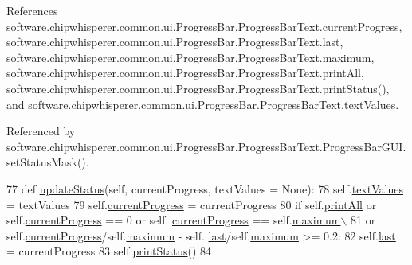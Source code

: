 References software.\+chipwhisperer.\+common.\+ui.\+Progress\+Bar.\+Progress\+Bar\+Text.\+current\+Progress, software.\+chipwhisperer.\+common.\+ui.\+Progress\+Bar.\+Progress\+Bar\+Text.\+last, software.\+chipwhisperer.\+common.\+ui.\+Progress\+Bar.\+Progress\+Bar\+Text.\+maximum, software.\+chipwhisperer.\+common.\+ui.\+Progress\+Bar.\+Progress\+Bar\+Text.\+print\+All, software.\+chipwhisperer.\+common.\+ui.\+Progress\+Bar.\+Progress\+Bar\+Text.\+print\+Status(), and software.\+chipwhisperer.\+common.\+ui.\+Progress\+Bar.\+Progress\+Bar\+Text.\+text\+Values.



Referenced by software.\+chipwhisperer.\+common.\+ui.\+Progress\+Bar.\+Progress\+Bar\+Text.\+Progress\+Bar\+G\+U\+I.\+set\+Status\+Mask().


\begin{DoxyCode}
77     \textcolor{keyword}{def }\hyperlink{classsoftware_1_1chipwhisperer_1_1common_1_1ui_1_1ProgressBar_1_1ProgressBarText_a46e30001d23b5970834a6b53bd27d80e}{updateStatus}(self, currentProgress, textValues = None):
78         self.\hyperlink{classsoftware_1_1chipwhisperer_1_1common_1_1ui_1_1ProgressBar_1_1ProgressBarText_a8cdd358344a6bb458f5c68bb41c8e99b}{textValues} = textValues
79         self.\hyperlink{classsoftware_1_1chipwhisperer_1_1common_1_1ui_1_1ProgressBar_1_1ProgressBarText_a090a37de67926fae5d5042142a064df7}{currentProgress} = currentProgress
80         \textcolor{keywordflow}{if} self.\hyperlink{classsoftware_1_1chipwhisperer_1_1common_1_1ui_1_1ProgressBar_1_1ProgressBarText_a61554f0e647192d2b7986d3f75ce401c}{printAll} \textcolor{keywordflow}{or} self.\hyperlink{classsoftware_1_1chipwhisperer_1_1common_1_1ui_1_1ProgressBar_1_1ProgressBarText_a090a37de67926fae5d5042142a064df7}{currentProgress} == 0 \textcolor{keywordflow}{or} self.
      \hyperlink{classsoftware_1_1chipwhisperer_1_1common_1_1ui_1_1ProgressBar_1_1ProgressBarText_a090a37de67926fae5d5042142a064df7}{currentProgress} == self.\hyperlink{classsoftware_1_1chipwhisperer_1_1common_1_1ui_1_1ProgressBar_1_1ProgressBarText_af23b7a0eff3cadc131c1aa94eda45860}{maximum}\(\backslash\)
81                 \textcolor{keywordflow}{or} self.\hyperlink{classsoftware_1_1chipwhisperer_1_1common_1_1ui_1_1ProgressBar_1_1ProgressBarText_a090a37de67926fae5d5042142a064df7}{currentProgress}/self.\hyperlink{classsoftware_1_1chipwhisperer_1_1common_1_1ui_1_1ProgressBar_1_1ProgressBarText_af23b7a0eff3cadc131c1aa94eda45860}{maximum} - self.
      \hyperlink{classsoftware_1_1chipwhisperer_1_1common_1_1ui_1_1ProgressBar_1_1ProgressBarText_a71f54cd66ddbf27c5bdbbfb4f43c905d}{last}/self.\hyperlink{classsoftware_1_1chipwhisperer_1_1common_1_1ui_1_1ProgressBar_1_1ProgressBarText_af23b7a0eff3cadc131c1aa94eda45860}{maximum} >= 0.2:
82             self.\hyperlink{classsoftware_1_1chipwhisperer_1_1common_1_1ui_1_1ProgressBar_1_1ProgressBarText_a71f54cd66ddbf27c5bdbbfb4f43c905d}{last} = currentProgress
83             self.\hyperlink{classsoftware_1_1chipwhisperer_1_1common_1_1ui_1_1ProgressBar_1_1ProgressBarText_aa929edbd55055ad79bdc6b4c240d0a18}{printStatus}()
84 
\end{DoxyCode}
